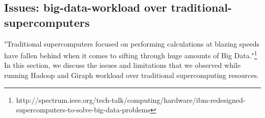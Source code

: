 \documentclass[conference]{IEEEtran}
\begin{document}

\subsection {Issues: big-data-workload over traditional-supercomputers}
"Traditional supercomputers focused on performing calculations at blazing speeds have fallen behind when it comes to sifting through huge amounts of Big Data."\footnote{http://spectrum.ieee.org/tech-talk/computing/hardware/ibm-redesigned-supercomputers-to-solve-big-data-problems}\\
In this section, we discuss the issues and limitations that we observed while running Hadoop and Giraph workload over traditional supercomputing resources.
\end{document}
